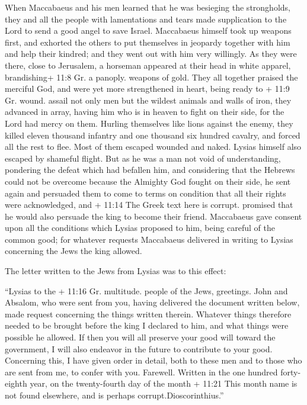  When Maccabaeus and his men learned that he was besieging
the strongholds, they and all the people with lamentations and tears
made supplication to the Lord to send a good angel to save Israel.
 Maccabaeus himself took up weapons first, and exhorted the
others to put themselves in jeopardy together with him and help their
kindred; and they went out with him very willingly.  As they
were there, close to Jerusalem, a horseman appeared at their head in
white apparel, brandishing+ 11:8 Gr. a panoply. weapons of gold.
 They all together praised the merciful God, and were yet
more strengthened in heart, being ready to + 11:9 Gr. wound. assail not
only men but the wildest animals and walls of iron,  they
advanced in array, having him who is in heaven to fight on their side,
for the Lord had mercy on them.  Hurling themselves like
lions against the enemy, they killed eleven thousand infantry and one
thousand six hundred cavalry, and forced all the rest to flee.
 Most of them escaped wounded and naked. Lysias himself
also escaped by shameful flight.  But as he was a man not
void of understanding, pondering the defeat which had befallen him, and
considering that the Hebrews could not be overcome because the Almighty
God fought on their side, he sent again  and persuaded them
to come to terms on condition that all their rights were acknowledged,
and + 11:14 The Greek text here is corrupt. promised that he would also
persuade the king to become their friend.  Maccabaeus gave
consent upon all the conditions which Lysias proposed to him, being
careful of the common good; for whatever requests Maccabaeus delivered
in writing to Lysias concerning the Jews the king allowed.

 The letter written to the Jews from Lysias was to this
effect:

``Lysias to the + 11:16 Gr. multitude. people of the Jews, greetings.
 John and Absalom, who were sent from you, having delivered
the document written below, made request concerning the things written
therein.  Whatever things therefore needed to be brought
before the king I declared to him, and what things were possible he
allowed.  If then you will all preserve your good will
toward the government, I will also endeavor in the future to contribute
to your good.  Concerning this, I have given order in
detail, both to these men and to those who are sent from me, to confer
with you.  Farewell. Written in the one hundred
forty-eighth year, on the twenty-fourth day of the month + 11:21 This
month name is not found elsewhere, and is perhaps
corrupt.Dioscorinthius.''

